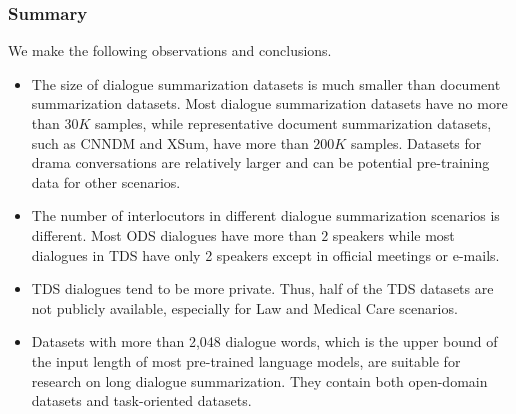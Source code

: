 \subsubsection{Summary}
We make the following observations and conclusions.
\begin{itemize}
	\item The size of dialogue summarization datasets is much smaller than document summarization datasets. Most dialogue summarization datasets have no more than $30K$ samples, while representative document summarization datasets, such as CNNDM and XSum, have more than $200K$ samples. Datasets for drama conversations are relatively larger and can be potential pre-training data for other scenarios.
	\item The number of interlocutors in different dialogue summarization scenarios is different. Most ODS dialogues have more than $2$ speakers while 
most dialogues in TDS have only 2 speakers except in official meetings or 
e-mails.
	\item TDS dialogues tend to be more private. Thus, half of the 
TDS datasets are not publicly available, especially for Law and 
Medical Care scenarios. 
	\item Datasets with more than 2,048 dialogue words, which is the upper bound of the input length of most pre-trained language models, are suitable for research on long dialogue summarization. They contain both open-domain datasets and task-oriented datasets. 
\end{itemize} 
 



